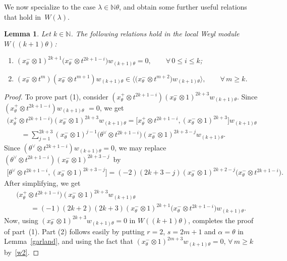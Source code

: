 \documentclass[11pt]{article}
\newtheorem{lemma}{Lemma}
\numberwithin{equation}{section}
\begin{document}
We now specialize to the case $\lambda\in \mathbb{N}\theta$, and obtain some further useful relations that hold in~$W(\lambda)$.
\begin{lemma}
\label{g}
Let $k\in\mathbb{N}$.
The following relations hold in the local Weyl module $W((k+1)\theta)$:
\begin{enumerate}\itemsep=0pt
\item[$1)$] $(x^{-}_{\theta}\otimes 1)^{2k+1}\big(x^{-}_{\theta}\otimes t^{2k+1-i}\big)w_{(k+1)\theta}=0,
\qquad
\forall\,
0\leq i \leq k$;
\item[$2)$] $(x^{-}_{\theta}\otimes t^m)(x^{-}_{\theta} \otimes t^{m+1})  w_{(k+1)\theta} \in  \big\langle \big(x^{-}_{\theta}
\otimes t^{m+2}\big) w_{(k+1)\theta} \rangle,
\qquad
\forall\,
m\geq k$.
\end{enumerate}
\end{lemma}

\begin{proof}
To prove part (1), consider $(x^{+}_{\theta}\!\otimes t^{2k{+}1{-}i}) (x^{-}_{\theta}\otimes 1)^{2k{+}3}w_{(k{+}1)\theta}$.
Since $(x^{+}_{\theta}\!\otimes t^{2k{+}1{-}i})w_{(k{+}1)\theta}$ $=0$, we get
\begin{gather*}
\big(x^{+}_{\theta}\otimes t^{2k+1-i}\big) (x^{-}_{\theta}\otimes 1)^{2k+3}w_{(k+1)\theta}
=\big[x^{+}_{\theta}\otimes t^{2k+1-i}, (x^{-}_{\theta}\otimes 1)^{2k+3}\big] w_{(k+1)\theta}
\\
\qquad{}
=\sum\limits_{j=1}^{2k+3}  (x^{-}_{\theta}\otimes 1)^{j-1}\big(\theta^{\vee}\otimes t^{2k+1-i}\big)(x^{-}_{\theta}\otimes
1)^{2k+3-j}w_{(k+1)\theta}.
\end{gather*}
Since $(\theta^{\vee}\otimes t^{2k+1-i})w_{(k+1)\theta}=0$, we may replace $(\theta^{\vee}\otimes
t^{2k+1-i})(x^{-}_{\theta}\otimes 1)^{2k+3-j}$~by
\begin{gather*}
\big[\theta^{\vee}\otimes t^{2k+1-i}, (x^{-}_{\theta}\otimes 1)^{2k+3-j}\big]
=(-2)(2k+3-j)(x^{-}_{\theta}\otimes 1)^{2k+2-j}\big(x^{-}_{\theta}\otimes t^{2k+1-i}\big).
\end{gather*}
After simplifying, we get
\begin{gather*}
\big(x^{+}_{\theta}\otimes t^{2k+1-i}\big) (x^{-}_{\theta}\otimes 1)^{2k+3}w_{(k+1)\theta}
\\
\qquad{}
=(-1)(2k+2)(2k+3)(x^{-}_{\theta}\otimes 1)^{2k+1}\big(x^{-}_{\theta}\otimes t^{2k+1-i}\big)w_{(k+1)\theta}.
\end{gather*}
Now, using $(x^{-}_{\theta}\otimes 1)^{2k+3}w_{(k+1)\theta}=0$ in $W((k+1)\theta)$, completes the proof of part~(1).
Part (2) follows easily by putting $r=2$, $s=2m+1$ and $\alpha=\theta$ in Lemma~\ref{garland}, and using the fact that
$(x^{-}_{\theta}\otimes 1)^{2m+3}w_{(k+1)\theta}=0$, $\forall\,
m\geq k$ by~\eqref{w2}.
\end{proof}
\end{document}
